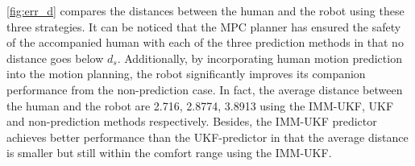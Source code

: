 \documentclass[letterpaper, 10 pt, conference]{ieeeconf}
\begin{document}
	\cref{fig:err_d} compares the distances between the human and the robot using these three strategies.
	It can be noticed that the MPC planner has ensured the safety of the accompanied human with each of the three prediction methods in that no distance goes below $d_s$.
	Additionally, by incorporating human motion prediction into the motion planning, the robot significantly improves its companion performance from the non-prediction case.
	In fact, the average distance between the human and the robot are 2.716, 2.8774, 3.8913 using the IMM-UKF, UKF and non-prediction methods respectively.
	Besides, the IMM-UKF predictor achieves better performance than the UKF-predictor in that the average distance is smaller but still within the comfort range using the IMM-UKF.
\end{document}
